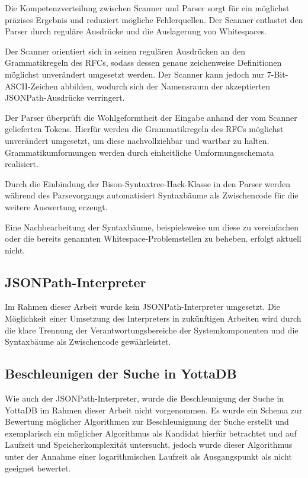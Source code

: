 \documentclass[oneside]{ausarbeitung}
\begin{document}
Die Kompetenzverteilung zwischen Scanner und Parser sorgt für ein möglichst präzises Ergebnis und reduziert mögliche Fehlerquellen. Der Scanner entlastet den Parser durch reguläre Ausdrücke und die Auslagerung von Whitespaces. 

Der Scanner orientiert sich in seinen regulären Ausdrücken an den Grammatikregeln des RFCs, sodass dessen genaue zeichenweise Definitionen möglichst unverändert umgesetzt werden. Der Scanner kann jedoch nur 7-Bit-ASCII-Zeichen abbilden, wodurch sich der Namensraum der akzeptierten JSONPath-Ausdrücke verringert.

Der Parser überprüft die Wohlgeformtheit der Eingabe anhand der vom Scanner gelieferten Tokens. Hierfür werden die Grammatikregeln des RFCs möglichst unverändert umgesetzt, um diese nachvollziehbar und wartbar zu halten. Grammatikumformungen werden durch einheitliche Umformungsschemata realisiert. 

Durch die Einbindung der Bison-Syntaxtree-Hack-Klasse in den Parser werden während des Parsevorgangs automatisiert Syntaxbäume als Zwischencode für die weitere Auswertung erzeugt.

Eine Nachbearbeitung der Syntaxbäume, beispielsweise um diese zu vereinfachen oder die bereits genannten Whitespace-Problemstellen zu beheben, erfolgt aktuell nicht.


\pagebreak

\subsection{JSONPath-Interpreter}

Im Rahmen dieser Arbeit wurde kein JSONPath-Interpreter umgesetzt. Die Möglichkeit einer Umsetzung des Interpreters in zukünftigen Arbeiten wird durch die klare Trennung der Verantwortungsbereiche der Systemkomponenten und die Syntaxbäume als Zwischencode gewährleistet.


\subsection{Beschleunigen der Suche in YottaDB}

Wie auch der JSONPath-Interpreter, wurde die Beschleunigung der Suche in YottaDB im Rahmen dieser Arbeit nicht vorgenommen. Es wurde ein Schema zur Bewertung möglicher Algorithmen zur Beschleunignung der Suche erstellt und exemplarisch ein möglicher Algorithmus als Kandidat hierfür betrachtet und auf Laufzeit und Speicherkomplexität untersucht, jedoch wurde dieser Algorithmus unter der Annahme einer logarithmischen Laufzeit als Ausgangspunkt als nicht geeignet bewertet.
\end{document}
